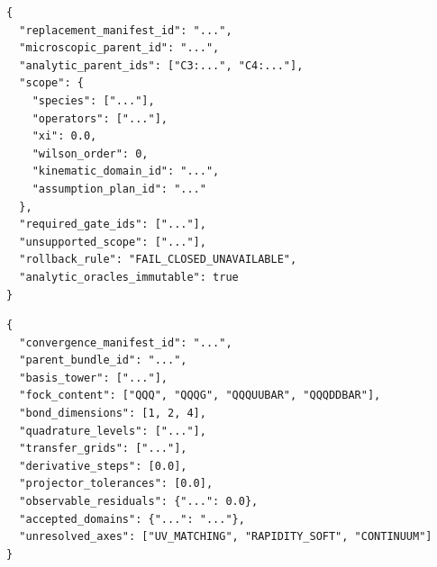 \documentclass[11pt]{article}
\begin{document}
\begin{verbatim}
{
  "replacement_manifest_id": "...",
  "microscopic_parent_id": "...",
  "analytic_parent_ids": ["C3:...", "C4:..."],
  "scope": {
    "species": ["..."],
    "operators": ["..."],
    "xi": 0.0,
    "wilson_order": 0,
    "kinematic_domain_id": "...",
    "assumption_plan_id": "..."
  },
  "required_gate_ids": ["..."],
  "unsupported_scope": ["..."],
  "rollback_rule": "FAIL_CLOSED_UNAVAILABLE",
  "analytic_oracles_immutable": true
}
\end{verbatim}

\begin{verbatim}
{
  "convergence_manifest_id": "...",
  "parent_bundle_id": "...",
  "basis_tower": ["..."],
  "fock_content": ["QQQ", "QQQG", "QQQUUBAR", "QQQDDBAR"],
  "bond_dimensions": [1, 2, 4],
  "quadrature_levels": ["..."],
  "transfer_grids": ["..."],
  "derivative_steps": [0.0],
  "projector_tolerances": [0.0],
  "observable_residuals": {"...": 0.0},
  "accepted_domains": {"...": "..."},
  "unresolved_axes": ["UV_MATCHING", "RAPIDITY_SOFT", "CONTINUUM"]
}
\end{verbatim}
\end{document}
